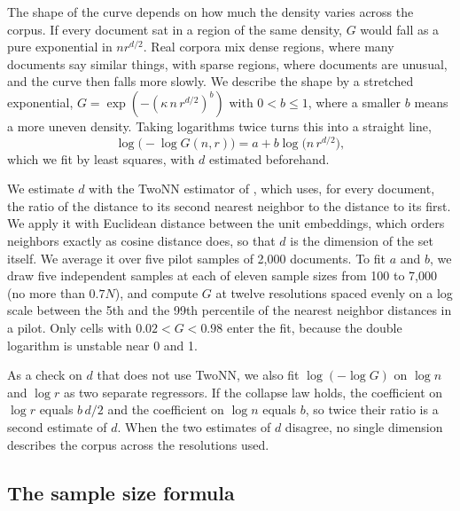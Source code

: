 The shape of the curve depends on how much the density varies across the corpus. If every document sat in a region of the same density, $G$ would fall as a pure exponential in $n r^{d/2}$. Real corpora mix dense regions, where many documents say similar things, with sparse regions, where documents are unusual, and the curve then falls more slowly. We describe the shape by a stretched exponential, $G = \exp(-(\kappa\, n\, r^{d/2})^{b})$ with $0 < b \le 1$, where a smaller $b$ means a more uneven density. Taking logarithms twice turns this into a straight line,
\begin{equation}
\log\big(-\log G(n, r)\big) = a + b \log\big(n\,r^{d/2}\big),
\label{eq:collapse}
\end{equation}
which we fit by least squares, with $d$ estimated beforehand.

We estimate $d$ with the TwoNN estimator of \citet{facco2017twonn}, which uses, for every document, the ratio of the distance to its second nearest neighbor to the distance to its first. We apply it with Euclidean distance between the unit embeddings, which orders neighbors exactly as cosine distance does, so that $d$ is the dimension of the set itself. We average it over five pilot samples of 2{,}000 documents. To fit $a$ and $b$, we draw five independent samples at each of eleven sample sizes from 100 to 7{,}000 (no more than $0.7N$), and compute $G$ at twelve resolutions spaced evenly on a log scale between the 5th and the 99th percentile of the nearest neighbor distances in a pilot. Only cells with $0.02 < G < 0.98$ enter the fit, because the double logarithm is unstable near 0 and 1.

As a check on $d$ that does not use TwoNN, we also fit $\log(-\log G)$ on $\log n$ and $\log r$ as two separate regressors. If the collapse law holds, the coefficient on $\log r$ equals $b\,d/2$ and the coefficient on $\log n$ equals $b$, so twice their ratio is a second estimate of $d$. When the two estimates of $d$ disagree, no single dimension describes the corpus across the resolutions used.

\subsection{The sample size formula}

